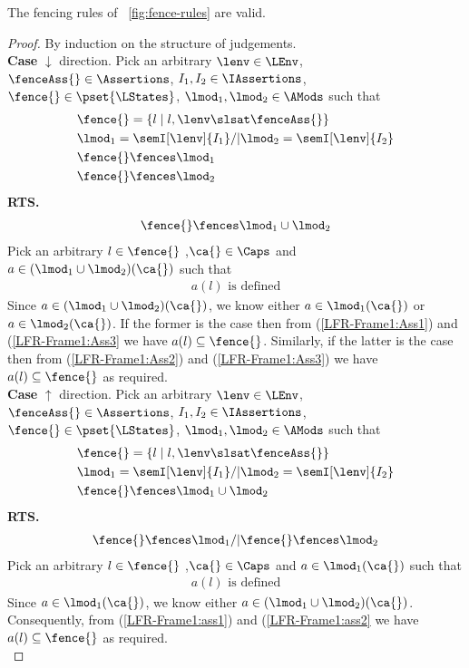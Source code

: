 \begin{lemma}\label{lem:fence-rules}
The fencing rules of \fig~\ref{fig:fence-rules} are valid. 
%
\begin{proof}
By induction on the structure of judgements. \\

\noindent\textbf{Case }$\downarrow$ direction.
Pick an arbitrary $\lenv \in \LEnv$, $\fenceAss{} \in \Assertions$, $I_1, I_2 \in \IAssertions$, $\fence{} \in \pset{\LStates}$, $\lmod_1, \lmod_2 \in \AMods$ such that 
%
\begin{align}
	& \fence{} = \left\{ l \mid l, \lenv \slsat \fenceAss{} \right\} \nonumber\\
	& \lmod_1 = \semI[\lenv]{I_1} /| \lmod_2 = \semI[\lenv]{I_2} \nonumber\\
	& \fence{} \fences \lmod_1 \label{LFR-Frame1:Ass1}\\
	& \fence{} \fences \lmod_2 \label{LFR-Frame1:Ass2}
\end{align}
%
\textbf{RTS. }
\begin{align*}
	\fence{} \fences \lmod_1 \cup \lmod_2
\end{align*}
%
Pick an arbitrary $l \in \fence{}$ ,$\ca{} \in \Caps$ and $a \in (\lmod_1 \cup \lmod_2)(\ca{})$ such that 
%
\begin{align}
	a(l) \text{ is defined} \label{LFR-Frame1:Ass3}
\end{align}
%
Since $a \in (\lmod_1 \cup \lmod_2)(\ca{})$, we know either $a \in \lmod_1(\ca{})$ or $a \in \lmod_2(\ca{})$. If the former is the case then from (\ref{LFR-Frame1:Ass1}) and (\ref{LFR-Frame1:Ass3} we have $a(l) \subseteq \fence{}$. Similarly, if the latter is the case then from (\ref{LFR-Frame1:Ass2}) and (\ref{LFR-Frame1:Ass3}) we have $a(l) \subseteq \fence{}$ as required.\\

%
%
\noindent\textbf{Case }$\uparrow$ direction.
Pick an arbitrary $\lenv \in \LEnv$, $\fenceAss{} \in \Assertions$, $I_1, I_2 \in \IAssertions$, $\fence{} \in \pset{\LStates}$, $\lmod_1, \lmod_2 \in \AMods$ such that 
%
\begin{align}
	& \fence{} = \left\{ l \mid l, \lenv \slsat \fenceAss{} \right\} \nonumber\\
	& \lmod_1 = \semI[\lenv]{I_1} /| \lmod_2 = \semI[\lenv]{I_2} \nonumber\\
	& \fence{} \fences \lmod_1 \cup \lmod_2 \label{LFR-Frame1:ass1}
\end{align}
%
\textbf{RTS. }
\begin{align*}
	\fence{} \fences \lmod_1  /| \fence{} \fences \lmod_2
\end{align*}
%
Pick an arbitrary $l \in \fence{}$ ,$\ca{} \in \Caps$ and $a \in \lmod_1(\ca{})$ such that 
%
\begin{align}
	a(l) \text{ is defined} \label{LFR-Frame1:ass2}
\end{align}
%
Since $a \in \lmod_1(\ca{})$, we know either $a \in (\lmod_1 \cup \lmod_2)(\ca{})$. Consequently, from (\ref{LFR-Frame1:ass1}) and (\ref{LFR-Frame1:ass2} we have $a(l) \subseteq \fence{}$ as required. \\


\end{proof}
\end{lemma}
